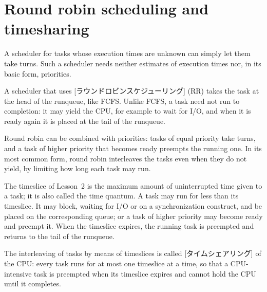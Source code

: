 \documentclass[../main.tex]{subfiles}
\begin{document}
\section{Round robin scheduling and timesharing}
\label{sec:l07-rr}

A scheduler for tasks whose execution times are unknown can simply let them
take turns.  Such a scheduler needs neither estimates of
execution times nor, in its basic form, priorities.

\begin{definition}
  A scheduler that uses
  [ラウンドロビンスケジューリング] (RR) takes
  the task at the head of the runqueue, like FCFS.  Unlike FCFS, a task
  need not run to completion: it may yield the CPU, for example to wait
  for I/O, and when it is ready again it is placed at the tail of the
  runqueue.
\end{definition}

Round robin can be combined with priorities: tasks of equal priority take
turns, and a task of higher priority that becomes ready preempts the
running one.  In its most common form, round robin interleaves the tasks
even when they do not yield, by limiting how long each task may run.

The timeslice of Lesson~2 is the maximum amount of
uninterrupted time given to a task; it is also called the time
quantum.  A
task may run for less than its timeslice.  It may block, waiting for I/O or
on a synchronization construct, and be placed on the corresponding queue;
or a task of higher priority may become ready and preempt it.  When the
timeslice expires, the running task is preempted and returns to the tail
of the runqueue.

\begin{definition}[Timesharing]
  The interleaving of tasks by means of timeslices is called
  [タイムシェアリング] of the CPU: every task runs for at
  most one timeslice at a time, so that a CPU-intensive task is preempted
  when its timeslice expires and cannot hold the CPU until it completes.
\end{definition}
\end{document}
